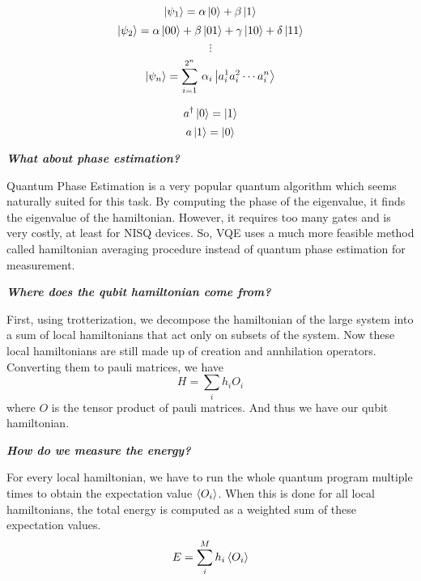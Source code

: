 \documentclass{article}
\begin{document}
\[\ket{\psi_1} = \alpha\ket{0} + \beta\ket{1}\]
\[\ket{\psi_2} = \alpha\ket{00} + \beta\ket{01} + \gamma\ket{10} + \delta\ket{11}\]
\[\vdots \]
\[\ket{\psi_n} = \sum\limits_{i=1}^{2^n}\, \alpha_i\ket{a_i^1a_i^2\cdots a_i^n}\]
\newpage

\[a^{\dagger}\ket{0} = \ket{1}\]
\[a\ket{1} = \ket{0}\]

\textbf{\textit{What about phase estimation?}}

Quantum Phase Estimation is a very popular quantum algorithm which seems
naturally suited for this task. By computing the phase of the eigenvalue, it
finds the eigenvalue of the hamiltonian. However, it requires too many gates
and is very costly, at least for NISQ devices. So, VQE uses a much
more feasible method called hamiltonian
averaging procedure instead of quantum phase estimation for measurement.


\textbf{\textit{Where does the qubit hamiltonian come from?}}

First, using trotterization, we decompose the hamiltonian of the large system
into a sum of local hamiltonians that act only on subsets of the system. Now
these local hamiltonians are still made up of creation and annhilation operators.
Converting them to pauli matrices, we have
\[H = \sum_i h_iO_i\]
where \(O\) is the tensor product of pauli matrices. And thus we have our
qubit hamiltonian.

\textbf{\textit{How do we measure the energy?}}

For every local hamiltonian, we have to run the whole quantum program multiple
times to obtain the expectation value \(\expval{O_i}\). When this is done
for all local hamiltonians, the total energy is computed as a weighted sum of these
expectation values.
\[E = \sum_i^{M} h_i \expval{O_i}\]
\end{document}
